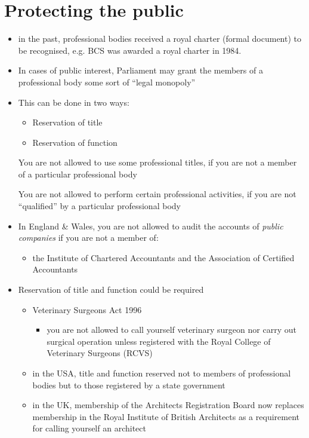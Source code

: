 \documentclass{article}
\begin{document}
\section{Protecting the public}
\begin{itemize}
\item in the past, professional bodies received a royal charter (formal document) to be recognised, e.g. BCS was awarded a royal charter in 1984.
\item In cases of public interest, Parliament may grant the members of a professional body some sort of ``legal monopoly''
\item This can be done in two ways:
\begin{itemize}
\item Reservation of title
\item Reservation of function
\end{itemize}
\begin{definition}
You are not allowed to use some professional titles, if you are not a member of a particular professional body
\end{definition}
\begin{definition}
You are not allowed to perform certain professional activities, if you are not ``qualified'' by a particular professional body
\end{definition}

\item In England \& Wales, you are not allowed to audit the accounts of \emph{public companies} if you are not a member of:
\begin{itemize}
\item the Institute of Chartered Accountants and the Association of Certified Accountants
\end{itemize}

\item Reservation of title and function could be required
\begin{itemize}
\item Veterinary Surgeons Act 1996
\begin{itemize}
\item you are not allowed to call yourself veterinary surgeon nor carry out surgical operation unless registered with the Royal College of Veterinary Surgeons (RCVS)
\end{itemize}
\item in the USA, title and function reserved not to members of professional bodies but to those registered by a state government
\item in the UK, membership of the Architects Registration Board now replaces membership in the Royal Institute of British Architects as a requirement for calling yourself an architect
\end{itemize}
\end{itemize}
\end{document}
